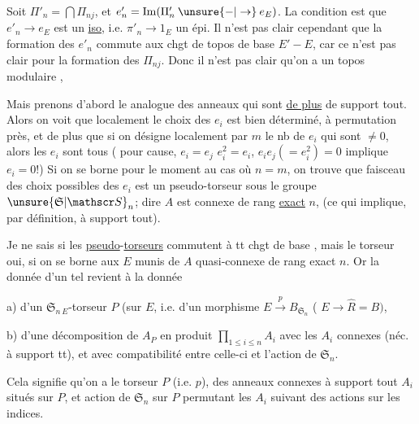Soit $\Pi'_n=\bigcap\Pi_{nj}$, et $e'_n=\operatorname{Im}(\Pi'_n\mathbin{\unsure{-|\to}}e_E)$. La condition est que $e'_n\to e_E$ est un \uline{iso}, i.e. $\pi'_n\to 1_E$ un épi. Il n'est pas clair cependant que la formation des $e'_n$ commute aux chgt de topos de base $E'\mathbin{-}E$, car ce n'est pas clair pour la formation des $\Pi_{nj}$. Donc il n'est pas clair qu'on a un topos modulaire ,

Mais prenons d'abord le  analogue des anneaux qui sont \uline{de plus} de support tout.
Alors on voit que localement le choix des $e_i$ est bien déterminé,  à permutation près, et de plus que si  on désigne localement par $m$ le nb de $e_i$ qui sont $\ne 0$, alors  les $e_i$ sont tous   ( pour cause, $e_i=e_j$  $e_i^2=e_i$, $e_i e_j(=e_i^2)=0$ implique $e_i=0$!) Si on se borne pour le moment au cas où $n=m$, on trouve que   faisceau des choix possibles des  $e_i$ est un pseudo-torseur  sous le groupe  $\unsure{\mathfrak S|\mathscr S}_n$; dire   $A$ est  connexe de rang \uline{exact} $n$, (ce qui implique, par définition, à support  tout). 

Je ne sais si les \uline{pseudo}-\uline{torseurs} commutent à tt chgt de base , mais le torseur oui, si on se borne aux $E$ munis de $A$ quasi-connexe de rang exact $n$. Or la donnée d'un tel revient à la donnée

a) d'un $\mathfrak S_{n\,E}$-torseur $P$ (sur $E$, i.e. d'un morphisme $E\xrightarrow{p}B_{\mathfrak S_n}$ ( $E\to\widehat R=B)$,

b) d'une décomposition de $A_P$ en produit $\prod_{1\le i\le n} A_i$ avec les $A_i$ connexes (néc. à support tt), et avec compatibilité entre celle-ci et l'action de $\mathfrak S_n$.

Cela signifie qu'on a le torseur $P$ (i.e. $p$), des anneaux connexes  à support tout $A_i$ situés sur $P$, et  action de $\mathfrak S_n$ sur $P$ permutant  les $A_i$ suivant des actions sur les indices.

